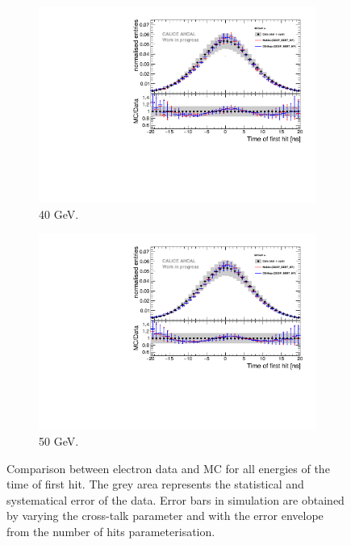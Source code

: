 \begin{figure}[t]
\begin{subfigure}[t]{0.45\textwidth}
		\includegraphics[width=1\textwidth]{chap5/fig_AHCAL_timing/Electrons/Comparison_SimData_Electrons40GeV.pdf}
		\caption{40 GeV.}\label{fig:elec_sim_data_40GeV}
	\end{subfigure}
	\hfill
	\begin{subfigure}[t]{0.45\textwidth}
		\centering
		\includegraphics[width=1\textwidth]{chap5/fig_AHCAL_timing/Electrons/Comparison_SimData_Electrons50GeV.pdf}
		\caption{50 GeV.}\label{fig:elec_sim_data_50GeV}
	\end{subfigure}
	\caption{Comparison between electron data and MC for all energies of the time of first hit. The grey area represents the statistical and systematical error of the data. Error bars in simulation are obtained by varying the cross-talk parameter and with the error envelope from the number of hits parameterisation.}
	\label{fig:sim_data_elec}
\end{figure}

